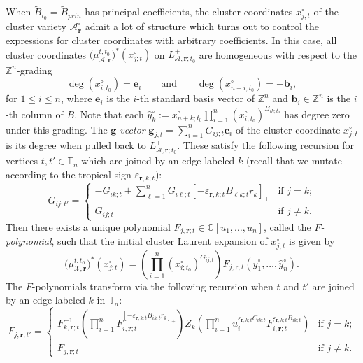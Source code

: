 \documentclass{amsart}
\numberwithin{equation}{section}
\newcommand{\bfb}{\mathbf{b}}
\newcommand{\bfe}{\mathbf{e}}
\newcommand{\bfg}{\mathbf{g}}
\newcommand{\bfr}{{\boldsymbol{r}}}
\newcommand{\cA}{\mathcal{A}}
\newcommand{\cX}{\mathcal{X}}
\newcommand{\CC}{\mathbb{C}}
\newcommand{\TT}{\mathbb{T}}
\newcommand{\ZZ}{\mathbb{Z}}
\begin{document}
When $\tilde B_{t_0}=\tilde B_{prin}$ has principal coefficients, the cluster coordinates $x_{j;t}^\circ$ of the cluster variety $\cA_\bfr^\circ$ admit a lot of structure which turns out to control the expressions for cluster coordinates with arbitrary coefficients.
In this case, all cluster coordinates $\big(\mu_{\cA,\bfr}^{t,t_0}\big)^*(x_{j;t}^\circ)$ on $L^+_{\cA,\bfr;t_0}$ are homogeneous with respect to the $\ZZ^n$-grading
\[\deg(x_{i;t_0}^\circ)=\bfe_i\qquad\text{and}\qquad\deg(x_{n+i;t_0}^\circ)=-\bfb_i,\]
for $1\le i\le n$, where $\bfe_i$ is the $i$-th standard basis vector of $\ZZ^n$ and $\bfb_i\in\ZZ^n$ is the $i$-th column of $B$.
Note that each $\hat y_k^\circ:=x_{n+k;t_0}^\circ\prod_{i=1}^n (x_{i;t_0}^\circ)^{B_{ik;t_0}}$ has degree zero under this grading.
The \emph{$\bfg$-vector} $\bfg_{j;t}=\sum\limits_{i=1}^n G_{ij;t}\bfe_i$ of the cluster coordinate $x_{j;t}^\circ$ is its degree when pulled back to $L^+_{\cA,\bfr;t_0}$.
These satisfy the following recursion for vertices $t,t'\in\TT_n$ which are joined by an edge labeled $k$ (recall that we mutate according to the tropical sign $\varepsilon_{\bfr,k;t}$):
\begin{equation}
  \label{eq:g-matrix mutation}
  G_{ij;t'}=
  \begin{cases}
    -G_{ik;t}+\sum\limits_{\ell=1}^n G_{i\ell;t}[-\varepsilon_{\bfr,k;t} B_{\ell k;t} r_k]_+ & \text{if $j=k$;}\\
    G_{ij;t} & \text{if $j\ne k$.}
  \end{cases}
\end{equation}
Then there exists a unique polynomial $F_{j,\bfr;t}\in\CC[u_1,\ldots,u_n]$, called the \emph{$F$-polynomial}, such that the initial cluster Laurent expansion of $x_{j;t}^\circ$ is given by
\[\big(\mu_{\cX,\bfr}^{t,t_0}\big)^*(x_{j;t}^\circ)=\left(\prod_{i=1}^n (x_{i;t_0}^\circ)^{G_{ij;t}}\right) F_{j,\bfr;t}(\hat y_1^\circ,\ldots,\hat y_n^\circ).\]
The $F$-polynomials transform via the following recursion when $t$ and $t'$ are joined by an edge labeled $k$ in $\TT_n$:
\begin{equation}
  \label{eq:F-polynomial mutation}
  F_{j,\bfr;t'}=
  \begin{cases}
    F_{k,\bfr;t}^{-1} \left(\prod_{i=1}^n F_{i,\bfr;t}^{[-\varepsilon_{\bfr,k;t} B_{ik;t} r_k]_+}\right) Z_k\left(\prod_{i=1}^n u_i^{\varepsilon_{\bfr,k;t} C_{ik;t}} F_{i,\bfr;t}^{\varepsilon_{\bfr,k;t} B_{ik;t}}\right) & \text{if $j=k$;}\\
    F_{j,\bfr;t} & \text{if $j\ne k$.}
  \end{cases}
\end{equation}
\end{document}
